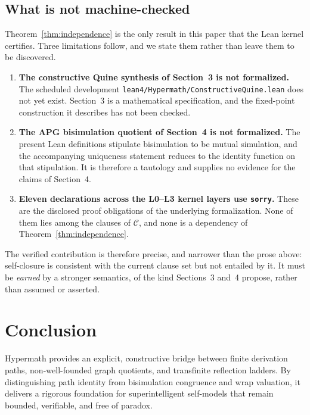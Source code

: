 \documentclass[11pt]{article}
\theoremstyle{definition}
\begin{document}
\subsection{What is not machine-checked}
Theorem~\ref{thm:independence} is the only result in this paper that the Lean kernel certifies. Three limitations follow, and we state them rather than leave them to be discovered.

\begin{enumerate}
\item \textbf{The constructive Quine synthesis of Section~3 is not formalized.} The scheduled development \texttt{lean4/Hypermath/ConstructiveQuine.lean} does not yet exist. Section~3 is a mathematical specification, and the fixed-point construction it describes has not been checked.
\item \textbf{The APG bisimulation quotient of Section~4 is not formalized.} The present Lean definitions stipulate bisimulation to be mutual simulation, and the accompanying uniqueness statement reduces to the identity function on that stipulation. It is therefore a tautology and supplies no evidence for the claims of Section~4.
\item \textbf{Eleven declarations across the L0--L3 kernel layers use \texttt{sorry}.} These are the disclosed proof obligations of the underlying formalization. None of them lies among the clauses of $\mathcal{C}$, and none is a dependency of Theorem~\ref{thm:independence}.
\end{enumerate}

The verified contribution is therefore precise, and narrower than the prose above: self-closure is consistent with the current clause set but not entailed by it. It must be \emph{earned} by a stronger semantics, of the kind Sections~3 and~4 propose, rather than assumed or asserted.

\section{Conclusion}
Hypermath provides an explicit, constructive bridge between finite derivation paths, non-well-founded graph quotients, and transfinite reflection ladders. By distinguishing path identity from bisimulation congruence and wrap valuation, it delivers a rigorous foundation for superintelligent self-models that remain bounded, verifiable, and free of paradox.
\end{document}
